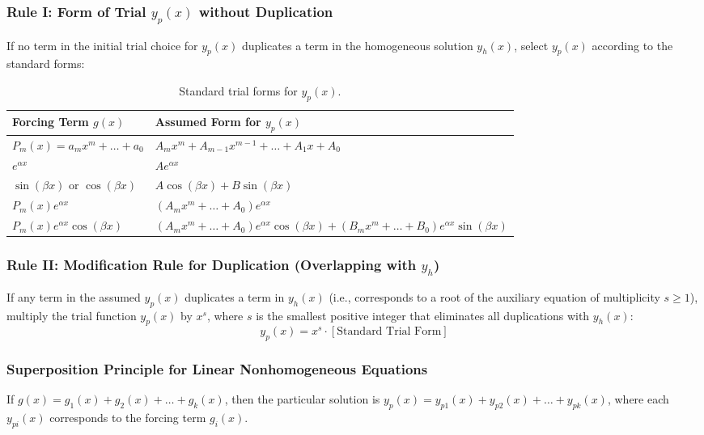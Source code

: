 \documentclass[11pt,letterpaper]{article}
\begin{document}
\subsubsection{Rule I: Form of Trial $y_p(x)$ without Duplication}
If no term in the initial trial choice for $y_p(x)$ duplicates a term in the homogeneous solution $y_h(x)$, select $y_p(x)$ according to the standard forms:
\begin{table}[h]
\centering
\begin{tabular}{@{}ll@{}}
\toprule
\textbf{Forcing Term $g(x)$} & \textbf{Assumed Form for $y_p(x)$} \\ \midrule
$P_m(x) = a_m x^m + \dots + a_0$ & $A_m x^m + A_{m-1} x^{m-1} + \dots + A_1 x + A_0$ \\
$e^{\alpha x}$ & $A e^{\alpha x}$ \\
$\sin(\beta x)$ or $\cos(\beta x)$ & $A \cos(\beta x) + B \sin(\beta x)$ \\
$P_m(x) e^{\alpha x}$ & $(A_m x^m + \dots + A_0) e^{\alpha x}$ \\
$P_m(x) e^{\alpha x} \cos(\beta x)$ & $(A_m x^m + \dots + A_0) e^{\alpha x} \cos(\beta x) + (B_m x^m + \dots + B_0) e^{\alpha x} \sin(\beta x)$ \\ \bottomrule
\end{tabular}
\caption{Standard trial forms for $y_p(x)$.}
\end{table}

\subsubsection{Rule II: Modification Rule for Duplication (Overlapping with $y_h$)}
If any term in the assumed $y_p(x)$ duplicates a term in $y_h(x)$ (i.e., corresponds to a root of the auxiliary equation of multiplicity $s \ge 1$), multiply the trial function $y_p(x)$ by $x^s$, where $s$ is the smallest positive integer that eliminates all duplications with $y_h(x)$:
\begin{equation}
    y_p(x) = x^s \cdot \left[ \text{Standard Trial Form} \right]
\end{equation}

\subsubsection{Superposition Principle for Linear Nonhomogeneous Equations}
If $g(x) = g_1(x) + g_2(x) + \dots + g_k(x)$, then the particular solution is $y_p(x) = y_{p1}(x) + y_{p2}(x) + \dots + y_{pk}(x)$, where each $y_{pi}(x)$ corresponds to the forcing term $g_i(x)$.
\end{document}
